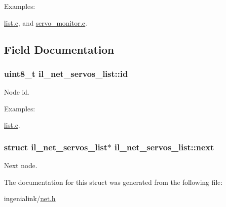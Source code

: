 \begin{Desc}
\item[Examples\+: ]\par
\hyperlink{list_8c-example}{list.\+c}, and \hyperlink{servo_monitor_8c-example}{servo\+\_\+monitor.\+c}.\end{Desc}


\subsection{Field Documentation}
\subsubsection[{\texorpdfstring{id}{id}}]{\setlength{\rightskip}{0pt plus 5cm}uint8\+\_\+t il\+\_\+net\+\_\+servos\+\_\+list\+::id}\hypertarget{structil__net__servos__list_a6c8494453cd1a81ddc9cf12d208dc95d}{}\label{structil__net__servos__list_a6c8494453cd1a81ddc9cf12d208dc95d}


Node id. 

\begin{Desc}
\item[Examples\+: ]\par
\hyperlink{list_8c-example}{list.\+c}.\end{Desc}
\subsubsection[{\texorpdfstring{next}{next}}]{\setlength{\rightskip}{0pt plus 5cm}struct {\bf il\+\_\+net\+\_\+servos\+\_\+list}$\ast$ il\+\_\+net\+\_\+servos\+\_\+list\+::next}\hypertarget{structil__net__servos__list_a04bbddceab98ab0f7e9cc50a9b46714e}{}\label{structil__net__servos__list_a04bbddceab98ab0f7e9cc50a9b46714e}


Next node. 



The documentation for this struct was generated from the following file\+:\begin{DoxyCompactItemize}
\item 
ingenialink/\hyperlink{net_8h}{net.\+h}\end{DoxyCompactItemize}
